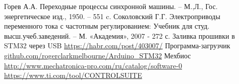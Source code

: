 \begin{thebibliography}{7}
        Горев А.А. Переходные процессы синхронной машины. -- М.,Л., Гос. энергетическое изд., 1950. -- 551 c.
        Соколовский Г.Г. Электроприводы переменного тока с частотным регулированием: Учебник для студ. высш.учеб.заведений.
                -- М. «Академия», 2007 - 272 с.
        Заливка прошивки в STM32 через USB \url{https://habr.com/post/403007/}
        Программа-загрузчик \url{github.com/rogerclarkmelbourne/Arduino\_STM32}
        Мехбиос \url{http://www.mechatronica-pro.com/ru/catalog/software-0}
         \url{https://www.ti.com/tool/CONTROLSUITE} 
\end{thebibliography}


